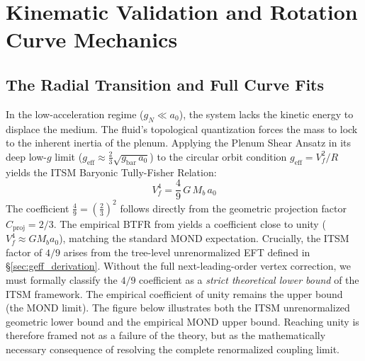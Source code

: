 \documentclass[aps,prd,10pt,twocolumn,superscriptaddress,nofootinbib,floatfix]{revtex4-2}
\begin{document}
\section{Kinematic Validation and Rotation Curve Mechanics}

\subsection{The Radial Transition and Full Curve Fits}
In the low-acceleration regime ($g_N \ll a_0$), the system lacks the kinetic energy to displace the medium. The fluid's topological quantization forces the mass to lock to the inherent inertia of the plenum. Applying the Plenum Shear Ansatz in its deep low-$g$ limit ($g_{\text{eff}} \approx \frac{2}{3}\sqrt{g_{\text{bar}}\,a_0}$) to the circular orbit condition $g_{\text{eff}} = V_f^2/R$ yields the ITSM Baryonic Tully-Fisher Relation:
\begin{equation}
V_f^4 = \frac{4}{9}\,G\,M_b\,a_0
\end{equation}
The coefficient $\frac{4}{9} = \left(\frac{2}{3}\right)^2$ follows directly from the geometric projection factor $C_{\text{proj}} = 2/3$. The empirical BTFR from \cite{sparc} yields a coefficient close to unity ($V_f^4 \approx G M_b a_0$), matching the standard MOND expectation. Crucially, the ITSM factor of $4/9$ arises from the tree-level unrenormalized EFT defined in \S\ref{sec:geff_derivation}. Without the full next-leading-order vertex correction, we must formally classify the $4/9$ coefficient as a \emph{strict theoretical lower bound} of the ITSM framework. The empirical coefficient of unity remains the upper bound (the MOND limit). The figure below illustrates both the ITSM unrenormalized geometric lower bound and the empirical MOND upper bound. Reaching unity is therefore framed not as a failure of the theory, but as the mathematically necessary consequence of resolving the complete renormalized coupling limit.
\end{document}
